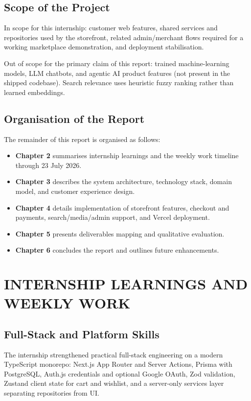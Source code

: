 \documentclass[12pt,a4paper]{report}
\begin{document}
\section{Scope of the Project}

In scope for this internship: customer web features, shared services and
repositories used by the storefront, related admin/merchant flows required for
a working marketplace demonstration, and deployment stabilisation.

Out of scope for the primary claim of this report: trained machine-learning
models, LLM chatbots, and agentic AI product features (not present in the
shipped codebase). Search relevance uses heuristic fuzzy ranking rather than
learned embeddings.


\section{Organisation of the Report}

The remainder of this report is organised as follows:

\begin{itemize}
    \item \textbf{Chapter 2} summarises internship learnings and the weekly
    work timeline through 23 July 2026.
    \item \textbf{Chapter 3} describes the system architecture, technology
    stack, domain model, and customer experience design.
    \item \textbf{Chapter 4} details implementation of storefront features,
    checkout and payments, search/media/admin support, and Vercel deployment.
    \item \textbf{Chapter 5} presents deliverables mapping and qualitative
    evaluation.
    \item \textbf{Chapter 6} concludes the report and outlines future
    enhancements.
\end{itemize}


\chapter{INTERNSHIP LEARNINGS AND WEEKLY WORK}

\section{Full-Stack and Platform Skills}

The internship strengthened practical full-stack engineering on a modern
TypeScript monorepo: Next.js App Router and Server Actions, Prisma with
PostgreSQL, Auth.js credentials and optional Google OAuth, Zod validation,
Zustand client state for cart and wishlist, and a server-only services layer
separating repositories from UI.
\end{document}
